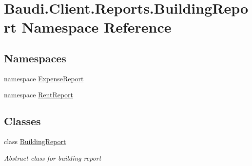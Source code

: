 \hypertarget{namespace_baudi_1_1_client_1_1_reports_1_1_building_report}{}\section{Baudi.\+Client.\+Reports.\+Building\+Report Namespace Reference}
\label{namespace_baudi_1_1_client_1_1_reports_1_1_building_report}
\subsection*{Namespaces}
\begin{DoxyCompactItemize}
\item 
namespace \hyperlink{namespace_baudi_1_1_client_1_1_reports_1_1_building_report_1_1_expense_report}{Expense\+Report}
\item 
namespace \hyperlink{namespace_baudi_1_1_client_1_1_reports_1_1_building_report_1_1_rent_report}{Rent\+Report}
\end{DoxyCompactItemize}
\subsection*{Classes}
\begin{DoxyCompactItemize}
\item 
class \hyperlink{class_baudi_1_1_client_1_1_reports_1_1_building_report_1_1_building_report}{Building\+Report}
\begin{DoxyCompactList}\small\item\em Abstract class for building report \end{DoxyCompactList}\end{DoxyCompactItemize}
